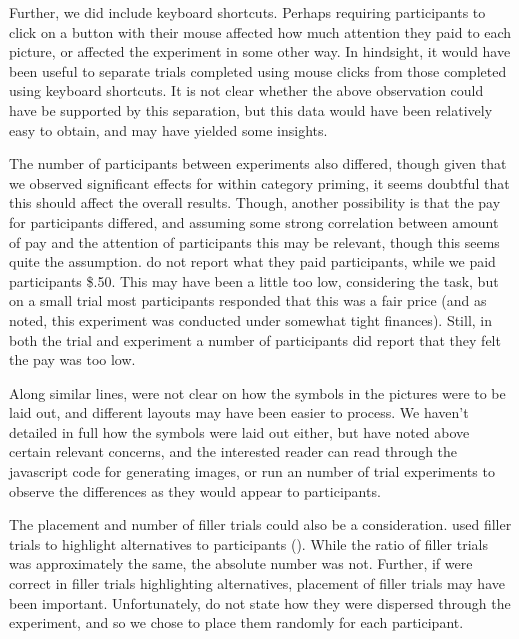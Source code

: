 \documentclass[10pt]{article}
\begin{document}
\begin{multicols}{2}
Further, we did include keyboard shortcuts.
Perhaps requiring participants to click on a button with their mouse affected how much attention they paid to each picture, or affected the experiment in some other way.
In hindsight, it would have been useful to separate trials completed using mouse clicks from those completed using keyboard shortcuts.
It is not clear whether the above observation could have be supported by this separation, but this data would have been relatively easy to obtain, and may have yielded some insights.

The number of participants between experiments also differed, though given that we observed significant effects for within category priming, it seems doubtful that this should affect the overall results.
Though, another possibility is that the pay for participants differed, and assuming some strong correlation between amount of pay and the attention of participants this may be relevant, though this seems quite the assumption.
\citeauthor{Bott:2016aa} do not report what they paid participants, while we paid participants \$.50.
This may have been a little too low, considering the task, but on a small trial most participants responded that this was a fair price (and as noted, this experiment was conducted under somewhat tight finances).
Still, in both the trial and experiment a number of participants did report that they felt the pay was too low.

Along similar lines, \citeauthor{Bott:2016aa} were not clear on how the symbols in the pictures were to be laid out, and different layouts may have been easier to process.
We haven't detailed in full how the symbols were laid out either, but have noted above certain relevant concerns, and the interested reader can read through the javascript code for generating images, or run an number of trial experiments to observe the differences as they would appear to participants.

The placement and number of filler trials could also be a consideration.
\citeauthor{Bott:2016aa} used filler trials to highlight alternatives to participants (\citeyear[123]{Bott:2016aa}).
While the ratio of filler trials was approximately the same, the absolute number was not.
Further, if \citeauthor{Bott:2016aa} were correct in filler trials highlighting alternatives, placement of filler trials may have been important.
Unfortunately, \citeauthor{Bott:2016aa} do not state how they were dispersed through the experiment, and so we chose to place them randomly for each participant.


\end{multicols}
\end{document}
